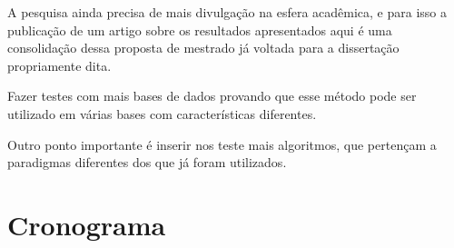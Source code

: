 A pesquisa ainda precisa de mais divulgação na esfera acadêmica, e para isso a publicação de um artigo sobre os resultados apresentados aqui é uma consolidação dessa proposta de mestrado já voltada para a dissertação propriamente dita.

Fazer testes com mais bases de dados  provando que esse método pode ser utilizado em várias bases com características  diferentes.

Outro ponto importante é inserir nos teste mais algoritmos, que pertençam a  paradigmas diferentes dos que já foram utilizados.




\section{Cronograma}\label{cap:cron}

